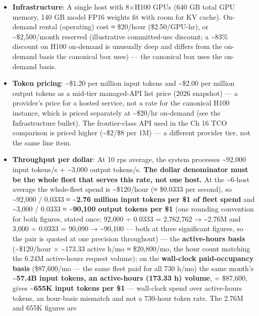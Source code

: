 \begin{itemize}
\tightlist
\item
  \textbf{Infrastructure}: A single host with 8×H100 GPUs (640 GB total
  GPU memory, 140 GB model FP16 weights fit with room for KV cache).
  On-demand rental (operating) cost ≈ \$20/hour (\$2.50/GPU-hr), or
  \textasciitilde\$2,500/month reserved (illustrative committed-use
  discount; a \textasciitilde83\% discount on H100 on-demand is
  unusually deep and differs from the on-demand basis the canonical box
  uses) --- the canonical box uses the on-demand basis.
\item
  \textbf{Token pricing}: \textasciitilde\$1.20 per million input tokens
  and \textasciitilde\$2.00 per million output tokens as a mid-tier
  managed-API list price (2026 snapshot) --- a provider's price for a
  hosted service, not a rate for the canonical H100 instance, which is
  priced separately at \textasciitilde\$20/hr on-demand (see the
  Infrastructure bullet). The frontier-class API used in the Ch 16 TCO
  comparison is priced higher (\textasciitilde\$2/\$8 per 1M) --- a
  different provider tier, not the same line item.
\item
  \textbf{Throughput per dollar}: At 10 rps average, the system
  processes \textasciitilde92,000 input tokens/s + \textasciitilde3,000
  output tokens/s. \textbf{The dollar denominator must be the whole
  fleet that serves this rate, not one host.} At the
  \textasciitilde6-host average the whole-fleet spend is
  \textasciitilde\$120/hour (≈ \$0.0333 per second), so
  \textasciitilde92,000 / 0.0333 ≈ \textbf{\textasciitilde2.76 million
  input tokens per \$1 of fleet spend} and \textasciitilde3,000 / 0.0333
  ≈ \textbf{\textasciitilde90,100 output tokens per \$1} (one rounding
  convention for both figures, stated once: 92,000 ÷ 0.0333 = 2,762,762
  → \textasciitilde2.76M and 3,000 ÷ 0.0333 = 90,090 →
  \textasciitilde90,100 --- both at three significant figures, so the
  pair is quoted at one precision throughout) --- the
  \textbf{active-hours basis} (\textasciitilde\$120/hour ×
  \textasciitilde173.33 active h/mo ≈ \$20,800/mo, the hour count
  matching the 6.24M active-hours request volume); on the
  \textbf{wall-clock paid-occupancy basis} (\$87,600/mo --- the same
  fleet paid for all 730 h/mo) the same month's
  \textbf{\textasciitilde57.4B input tokens, an active-hours (173.33 h)
  volume}, ÷ \$87,600, gives \textbf{\textasciitilde655K input tokens
  per \$1} --- wall-clock spend over active-hours tokens, an hour-basis
  mismatch and not a 730-hour token rate. The 2.76M and 655K figures are

\end{itemize}
